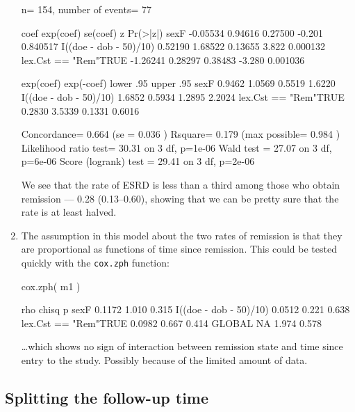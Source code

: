 \begin{enumerate}
\begin{Schunk}
\begin{Soutput}
  n= 154, number of events= 77 

                           coef exp(coef) se(coef)      z Pr(>|z|)
sexF                   -0.05534   0.94616  0.27500 -0.201 0.840517
I((doe - dob - 50)/10)  0.52190   1.68522  0.13655  3.822 0.000132
lex.Cst == "Rem"TRUE   -1.26241   0.28297  0.38483 -3.280 0.001036

                       exp(coef) exp(-coef) lower .95 upper .95
sexF                      0.9462     1.0569    0.5519    1.6220
I((doe - dob - 50)/10)    1.6852     0.5934    1.2895    2.2024
lex.Cst == "Rem"TRUE      0.2830     3.5339    0.1331    0.6016

Concordance= 0.664  (se = 0.036 )
Rsquare= 0.179   (max possible= 0.984 )
Likelihood ratio test= 30.31  on 3 df,   p=1e-06
Wald test            = 27.07  on 3 df,   p=6e-06
Score (logrank) test = 29.41  on 3 df,   p=2e-06
\end{Soutput}
\end{Schunk}
  We see that the rate of ESRD is less than a third among those
  who obtain remission --- 0.28 (0.13--0.60), showing that we can be
  pretty sure that the rate is at least halved.

  
\item The assumption in this model about the two rates of remission is
  that they are proportional as functions of time since
  remission. This could be tested quickly with the \texttt{cox.zph} function:
\begin{Schunk}
\begin{Sinput}
 cox.zph( m1 )
\end{Sinput}
\begin{Soutput}
                          rho chisq     p
sexF                   0.1172 1.010 0.315
I((doe - dob - 50)/10) 0.0512 0.221 0.638
lex.Cst == "Rem"TRUE   0.0982 0.667 0.414
GLOBAL                     NA 1.974 0.578
\end{Soutput}
\end{Schunk}
  \ldots which shows no sign of interaction between remission state
  and time since entry to the study. Possibly because of the limited
  amount of data.

\end{enumerate}

\subsection{Splitting the follow-up time}



